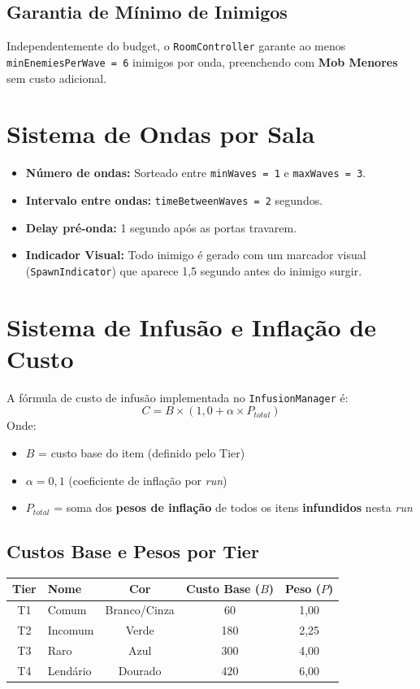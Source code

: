 \documentclass[a4paper,12pt]{report}
\begin{document}
\subsection{Garantia de Mínimo de Inimigos}
Independentemente do budget, o \texttt{RoomController} garante ao menos \texttt{minEnemiesPerWave = 6} inimigos por onda, preenchendo com \textbf{Mob Menores} sem custo adicional.

\section{Sistema de Ondas por Sala}
\begin{itemize}
    \item \textbf{Número de ondas:} Sorteado entre \texttt{minWaves = 1} e \texttt{maxWaves = 3}.
    \item \textbf{Intervalo entre ondas:} \texttt{timeBetweenWaves = 2} segundos.
    \item \textbf{Delay pré-onda:} 1 segundo após as portas travarem.
    \item \textbf{Indicador Visual:} Todo inimigo é gerado com um marcador visual (\texttt{SpawnIndicator}) que aparece 1,5 segundo antes do inimigo surgir.
\end{itemize}

\section{Sistema de Infusão e Inflação de Custo}\label{sec:inflacao}

A fórmula de custo de infusão implementada no \texttt{InfusionManager} é:
\[
C = B \times (1{,}0 + \alpha \times P_{total})
\]
Onde:
\begin{itemize}
    \item $B$ = custo base do item (definido pelo Tier)
    \item $\alpha = 0{,}1$ \quad (coeficiente de inflação por \textit{run})
    \item $P_{total}$ = soma dos \textbf{pesos de inflação} de todos os itens \textbf{infundidos} nesta \textit{run}
\end{itemize}

\subsection{Custos Base e Pesos por Tier}
\begin{center}
\begin{tabular}{|c|l|c|c|c|}
    \hline
    \textbf{Tier} & \textbf{Nome} & \textbf{Cor} & \textbf{Custo Base ($B$)} & \textbf{Peso ($P$)} \\
    \hline
    T1 & Comum    & Branco/Cinza & 60  & 1,00 \\
    T2 & Incomum  & Verde        & 180 & 2,25 \\
    T3 & Raro     & Azul         & 300 & 4,00 \\
    T4 & Lendário & Dourado      & 420 & 6,00 \\
    \hline
\end{tabular}
\end{center}
\end{document}
